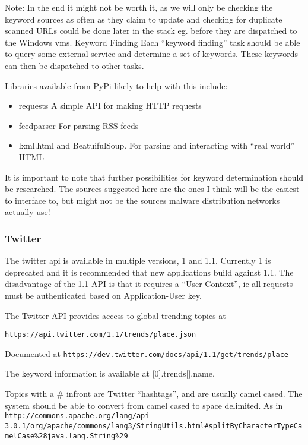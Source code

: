Note: In the end it might not be worth it, as we will only be checking the keyword sources as often as they claim to update and checking for duplicate scanned URLs could be done later in the stack eg. before they are dispatched to the Windows vms.
Keyword Finding
Each ``keyword finding'' task should be able to query some external service and determine a set of keywords. These keywords can then be dispatched to other tasks.

Libraries available from PyPi likely to help with this include:

\begin{itemize}
    \item requests A simple API for making HTTP requests
    \item feedparser For parsing RSS feeds
    \item lxml.html and BeatuifulSoup. For parsing and interacting with ``real world'' HTML
\end{itemize}

It is important to note that further possibilities for keyword determination should be researched. The sources suggested here are the ones I think will be the easiest to interface to, but might not be the sources malware distribution networks actually use!

\subsubsection{Twitter}
The twitter api is available in multiple versions, 1 and 1.1. Currently 1 is deprecated and it is recommended that new applications build against 1.1.  The disadvantage of the 1.1 API is that it requires a ``User Context'', ie all requests must be authenticated based on Application-User key.

The Twitter API provides access to global trending topics at

\verb`https://api.twitter.com/1.1/trends/place.json`

Documented at \verb`https://dev.twitter.com/docs/api/1.1/get/trends/place`

The keyword information is available at [0].trends[].name.

Topics with a \# infront are Twitter ``hashtags'', and are usually camel cased. The system should be able to convert from camel cased to space delimited. As in \verb`http://commons.apache.org/lang/api-3.0.1/org/apache/commons/lang3/StringUtils.html#splitByCharacterTypeCamelCase%28java.lang.String%29`

